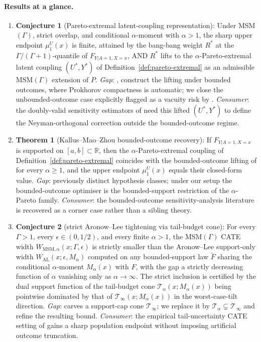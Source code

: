 \documentclass[11pt]{article}
\newcommand{\R}{\mathbb{R}}
\theoremstyle{definition}
\theoremstyle{plain}
\theoremstyle{remark}
\begin{document}
\paragraph{Results at a glance.}
\begin{enumerate}[label=(\arabic*)]
  \item \textbf{Conjecture 1} (Pareto-extremal latent-coupling representation): Under MSM$(\Gamma)$, strict overlap, and conditional $\alpha$-moment with $\alpha > 1$, the sharp upper endpoint $\mu_1^U(x)$ is finite, attained by the bang-bang weight $R^*$ at the $\Gamma/(\Gamma+1)$-quantile of $F_{Y|A=1, X=x}$, AND $R^*$ lifts to the $\alpha$-Pareto-extremal latent coupling $(U^*, Y^*)$ of Definition~\ref{def:pareto-extremal} as an admissible MSM$(\Gamma)$ extension of $P$. \emph{Gap}: \citet[Thm.~3.1]{KallusMaoZhou2019}, \citet[Thm.~1]{YadlowskyNamkoongBasuDuchiTian2022} construct the lifting under bounded outcomes, where Prokhorov compactness is automatic; we close the unbounded-outcome case explicitly flagged as a vacuity risk by \citet[Sec.~3.1, p.~5]{AsiaeePalBeckHuling2026}. \emph{Consumer}: the doubly-valid sensitivity estimators of \citet[Thm.~1]{DornGuoKallus2025} need this lifted $(U^*, Y^*)$ to define the Neyman-orthogonal correction outside the bounded-outcome regime.
  \item \textbf{Theorem 1} (Kallus--Mao--Zhou bounded-outcome recovery): If $F_{Y|A=1, X=x}$ is supported on $[a,b] \subset \R$, then the $\alpha$-Pareto-extremal coupling of Definition~\ref{def:pareto-extremal} coincides with the bounded-outcome lifting of \citet[Thm.~3.1, eq.~(7)]{KallusMaoZhou2019} for every $\alpha \ge 1$, and the upper endpoint $\mu_1^U(x)$ equals their closed-form value. \emph{Gap}: previously distinct hypothesis classes; under our setup the bounded-outcome optimiser is the bounded-support restriction of the $\alpha$-Pareto family. \emph{Consumer}: the bounded-outcome sensitivity-analysis literature \citep{KallusMaoZhou2019,YadlowskyNamkoongBasuDuchiTian2022,DornGuoKallus2025} is recovered as a corner case rather than a sibling theory.
  \item \textbf{Conjecture 2} (strict Aronow--Lee tightening via tail-budget cone): For every $\Gamma > 1$, every $\epsilon \in (0, 1/2)$, and every finite $\alpha > 1$, the MSM$(\Gamma)$ CATE width $W_{\mathrm{MSM},\alpha}(x; \Gamma, \epsilon)$ is strictly smaller than the Aronow--Lee \citep[Thm.~1]{AronowLee2013} support-only width $W_{\mathrm{AL}}(x; \epsilon, M_\alpha)$ computed on any bounded-support law $\tilde F$ sharing the conditional $\alpha$-moment $M_\alpha(x)$ with $F$, with the gap a strictly decreasing function of $\alpha$ vanishing only as $\alpha \to \infty$. The strict inclusion is certified by the dual support function of the tail-budget cone $\mathcal{T}_\alpha(x; M_\alpha(x))$ being pointwise dominated by that of $\mathcal{T}_\infty(x; M_\alpha(x))$ in the worst-case-tilt direction. \emph{Gap}: \citet{AronowLee2013} carves a support-cap cone $\mathcal{T}_\infty$; we replace it by $\mathcal{T}_\alpha \subsetneq \mathcal{T}_\infty$ and refine the resulting bound. \emph{Consumer}: the empirical tail-uncertainty CATE setting of \citet{LordanSalehzadehNobari2026} gains a sharp population endpoint without imposing artificial outcome truncation.

\end{enumerate}
\end{document}
